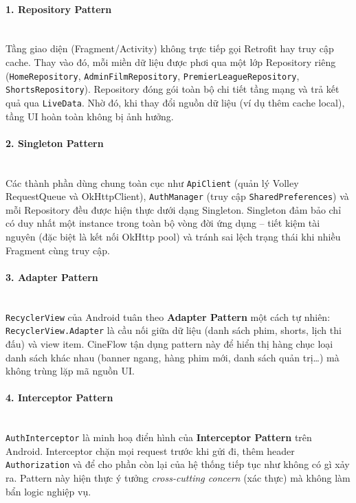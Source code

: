 \paragraph{1. Repository Pattern}
\mbox{}\\
Tầng giao diện (Fragment/Activity) không trực tiếp gọi Retrofit hay truy cập cache.
Thay vào đó, mỗi miền dữ liệu được phơi qua một lớp Repository riêng
(\texttt{HomeRepository}, \texttt{AdminFilmRepository},
\texttt{PremierLeagueRepository}, \texttt{ShortsRepository}). Repository đóng gói toàn bộ chi tiết tầng mạng
và trả kết quả qua \texttt{LiveData}. Nhờ đó, khi thay đổi nguồn dữ liệu (ví dụ
thêm cache local), tầng UI hoàn toàn không bị ảnh hưởng.

\paragraph{2. Singleton Pattern}
\mbox{}\\
Các thành phần dùng chung toàn cục như \texttt{ApiClient} (quản lý Volley RequestQueue và OkHttpClient),
\texttt{AuthManager} (truy cập \texttt{SharedPreferences}) và mỗi Repository đều
được hiện thực dưới dạng Singleton. Singleton đảm bảo chỉ có duy nhất một instance
trong toàn bộ vòng đời ứng dụng -- tiết kiệm tài nguyên (đặc biệt là kết nối
OkHttp pool) và tránh sai lệch trạng thái khi nhiều Fragment cùng truy cập.

\paragraph{3. Adapter Pattern}
\mbox{}\\
\texttt{RecyclerView} của Android tuân theo \textbf{Adapter Pattern} một cách tự
nhiên: \texttt{RecyclerView.Adapter} là cầu nối giữa dữ liệu (danh sách phim,
shorts, lịch thi đấu) và view item. CineFlow tận dụng pattern này để hiển thị
hàng chục loại danh sách khác nhau (banner ngang, hàng phim mới, danh sách quản
trị\dots) mà không trùng lặp mã nguồn UI.

\paragraph{4. Interceptor Pattern}
\mbox{}\\
\texttt{AuthInterceptor} là minh hoạ điển hình của \textbf{Interceptor Pattern}
trên Android. Interceptor chặn mọi request trước khi gửi đi, thêm header
\texttt{Authorization} và để cho phần còn lại của hệ thống tiếp tục như không có
gì xảy ra. Pattern này hiện thực ý tưởng \textit{cross-cutting concern} (xác thực)
mà không làm bẩn logic nghiệp vụ.

